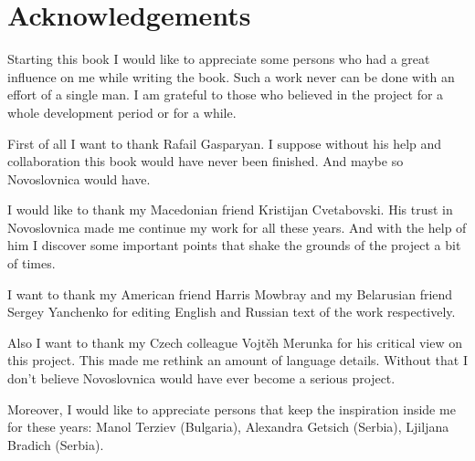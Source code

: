 \chapter{Acknowledgements}

Starting this book I would like to appreciate some persons who had a great influence on me while writing the book. Such a work never can be done with an effort of a single man. I am grateful to those who believed in the project for a whole development period or for a while.

First of all I want to thank Rafail Gasparyan. I suppose without his help and collaboration this book would have never been finished. And maybe so Novoslovnica would have.

I would like to thank my Macedonian friend Kristijan Cvetabovski. His trust in Novoslovnica made me continue my work for all these years. And with the help of him I discover some important points that shake the grounds of the project a bit of times.

I want to thank my American friend Harris Mowbray and my Belarusian friend Sergey Yanchenko for editing English and Russian text of the work respectively.

Also I want to thank my Czech colleague Vojtěh Merunka for his critical view on this project. This made me rethink an amount of language details. Without that I don't believe Novoslovnica would have ever become a serious project. 

Moreover, I would like to appreciate persons that keep the inspiration inside me for these years: Manol Terziev (Bulgaria), Alexandra Getsich (Serbia), Ljiljana Bradich (Serbia).
